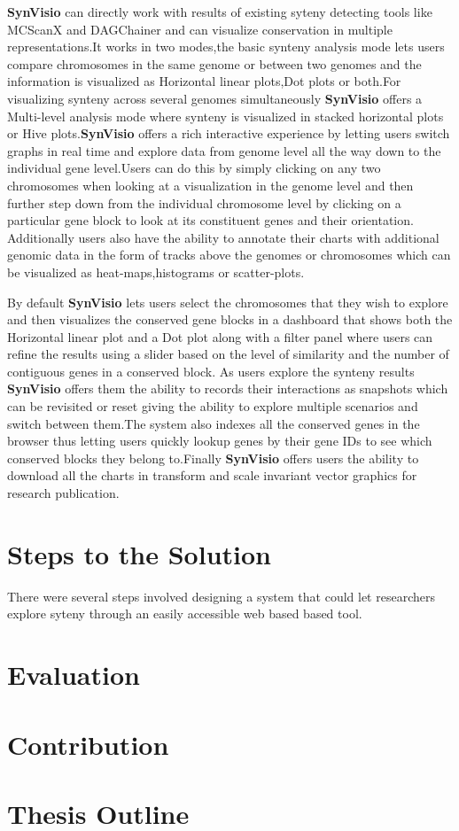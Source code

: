 \textbf{SynVisio} can directly work with results of existing syteny detecting tools like MCScanX and DAGChainer and can visualize conservation in multiple representations.It works in two modes,the basic synteny analysis mode lets users compare chromosomes in the same genome or between two genomes and the information is visualized as Horizontal linear plots,Dot plots or both.For visualizing synteny across several genomes simultaneously \textbf{SynVisio} offers a Multi-level analysis mode where synteny is visualized in stacked horizontal plots or Hive plots.\textbf{SynVisio} offers a rich interactive experience by letting users switch graphs in real time and explore data from genome level all the way down to the individual gene level.Users can do this by simply clicking on any two chromosomes when looking at a visualization in the genome level and then further step down from the individual chromosome level by clicking on a particular gene block to look at its constituent  genes and their orientation. Additionally users also have the ability to annotate their charts with additional genomic data in the form of tracks above the genomes or chromosomes which can be visualized as heat-maps,histograms or scatter-plots.

By default \textbf{SynVisio} lets users select the chromosomes that they wish to explore and then visualizes the conserved gene blocks in a dashboard that shows both the Horizontal linear plot and a Dot plot along with a filter panel where users can refine the results using a slider based on the level of similarity and the number of contiguous genes in a conserved block.
As users explore the synteny results \textbf{SynVisio} offers them the ability to records their interactions as snapshots which can be revisited or reset giving the ability to explore multiple scenarios and switch between them.The system also indexes all the conserved genes in the browser thus letting users quickly lookup genes by their gene IDs to see which conserved blocks they belong to.Finally \textbf{SynVisio} offers users the ability to download all the charts in transform and scale invariant vector graphics for research publication.

\section{Steps to the Solution} 
There were several steps involved designing a system that could let researchers explore syteny through an easily accessible web based based tool.

\section{Evaluation}

\section{Contribution}

\section{Thesis Outline}